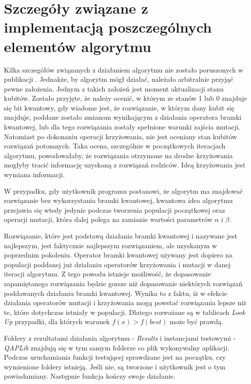 \section{Szczegóły związane z implementacją poszczególnych elementów algorytmu}
Kilka szczegółów związanych z działaniem algorytmu nie zostało poruszonych w publikacji \cite{NPQGA}. Jednakże, by algorytm mógł działać, należało arbitralnie przyjąć pewne założenia. Jednym z takich założeń jest moment aktualizacji stanu kubitów. Zostało przyjęte, że należy ocenić, w którym ze stanów 1 lub 0 znajduje się bit kwantowy, gdy wiadome jest, że rozwiązanie, w którym dany kubit się znajduje, poddane zostało zmianom wynikającym z działania operatora bramki kwantowej, lub dla tego rozwiązania zostały spełnione warunki zajścia mutacji. Natomiast po dokonaniu operacji krzyżowania, nie jest oceniany stan kubitów rozwiązań potomnych. Taka ocena, szczególnie w początkowych iteracjach algorytmu, powodowałaby, że rozwiązania otrzymane na drodze krzyżowania mogłyby tracić informację uzyskaną z rozwiązań rodziców. Ideą krzyżowania jest wymiana informacji.

W przypadku, gdy użytkownik programu postanowi, że algorytm ma znajdować rozwiązanie bez wykorzystania bramki kwantowej, kwantowa idea algorytmu przejawia się wtedy jedynie podczas tworzenia populacji początkowej oraz operacji mutacji, która dalej polega na zamianie wartości parametrów $\alpha$ i $\beta$.

Rozwiązanie, które jest podstawą działania bramki kwantowej i nazywane jest najlepszym, jest faktycznie najlepszym rozwiązaniem, ale uzyskanym w poprzednim pokoleniu. Operator bramki kwantowej używany jest dopiero na populacji poddanej już działaniu operatorów krzyżowania i mutacji w danej iteracji algorytmu. Z tego powodu istnieje możliwość, że dopasowanie zapamiętanego rozwiązania będzie gorsze niż dopasowanie niektórych rozwiązań poddawanych działaniu bramki kwantowej. Wynika to z faktu, iż w efekcie działania operatorów mutacji i krzyżowania mogą powstać rozwiązania lepsze niż te, które dotychczas istniały w populacji. Dlatego rozważane są w tablicach \textit{Look Up} przypadki, dla których warunek $f(x)>f(best)$ może być prawdą.

Foldery z rezultatami działania algorytmu - \textit{Results} i instancjami testowymi - \textit{QAPLib} znajdują się w tym samym folderze co plik wykonywalny aplikacji. Podczas uruchamiania funkcji testującej sprawdzane jest na początku, czy wymienione foldery istnieją. Jeśli nie, są tworzone i użytkownik jest o tym powiadamiany. Następnie funkcja kończy swoje działanie.

